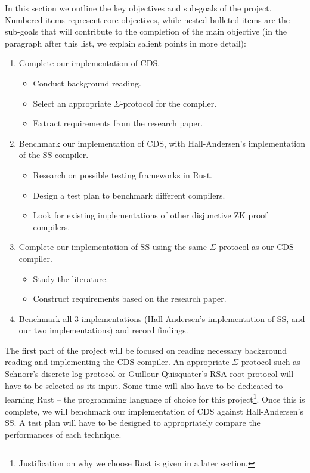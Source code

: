 In this section we outline the key objectives and sub-goals of the project. Numbered items represent core objectives, while nested bulleted items are the sub-goals that will contribute to the completion of the main objective (in the paragraph after this list, we explain salient points in more detail):
\begin{enumerate}
    \item Complete our implementation of CDS.
    \begin{itemize}
        \item Conduct background reading.
        \item Select an appropriate $\Sigma$-protocol for the compiler.
        \item Extract requirements from the research paper. 
    \end{itemize}
    \item Benchmark our implementation of CDS, with Hall-Andersen's implementation \cite{MHAStackSig} of the SS compiler.
    \begin{itemize}
        \item Research on possible testing frameworks in Rust. 
        \item Design a test plan to benchmark different compilers. 
        \item Look for existing implementations of other disjunctive ZK proof compilers.
    \end{itemize}
    \item Complete our implementation of SS using the same $\Sigma$-protocol as our CDS compiler.
    \begin{itemize}
        \item Study the literature.
        \item Construct requirements based on the research paper.
    \end{itemize}
    \item Benchmark all 3 implementations (Hall-Andersen's implementation of SS, and our two implementations) and record findings.
\end{enumerate}
The first part of the project will be focused on reading necessary background reading and implementing the CDS compiler. An appropriate $\Sigma$-protocol such as Schnorr's discrete log protocol \cite{Schnorr} or Guillour-Quisquater's RSA root protocol \cite{Guillou1988APZ} will have to be selected as its input. Some time will also have to be dedicated to learning Rust -- the programming language of choice for this project\footnote{Justification on why we choose Rust is given in a later section.}. Once this is complete, we will benchmark our implementation of CDS against Hall-Andersen's SS. A test plan will have to be designed to appropriately compare the performances of each technique.

